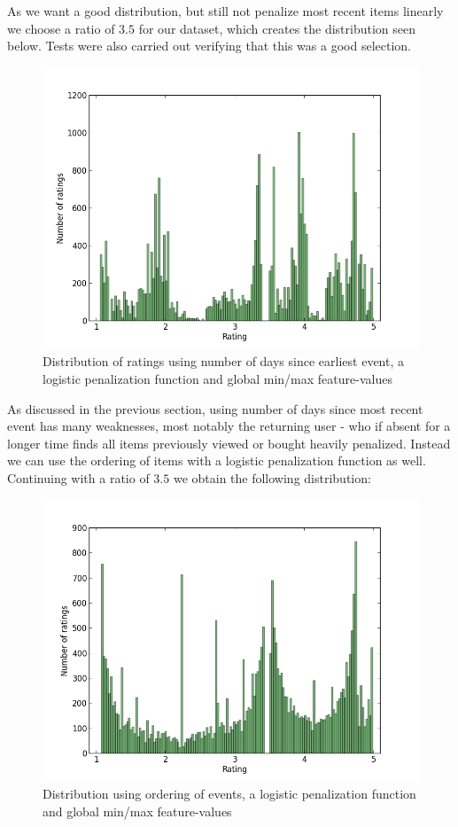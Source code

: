 As we want a good distribution, but still not penalize most recent items
linearly we choose a ratio of $3.5$ for our dataset, which creates the
distribution seen below. Tests were also carried out verifying that this was a
good selection.

\begin{figure}[H]
  \centering
  \includegraphics[scale=0.5]{image/dist-sigmoid-fixed-recentness-3-5}
  \caption{Distribution of ratings using number of days since earliest event,
  a logistic penalization function and global min/max feature-values}
  \label{fig:dist-recentness-sigmoid}
\end{figure}

As discussed in the previous section, using number of days since most recent
event has many weaknesses, most notably the returning user - who if absent for
a longer time finds all items previously viewed or bought heavily penalized.
Instead we can use the ordering of items with a logistic penalization function
as well. Continuing with a ratio of $3.5$ we obtain the following distribution:

\begin{figure}[H]
  \centering
  \includegraphics[scale=0.5]{image/dist-sigmoid-fixed-count-3-5}
  \caption{Distribution using ordering of events, a logistic penalization
  function and global min/max feature-values}
  \label{fig:dist-count-sigmoid}
\end{figure}

